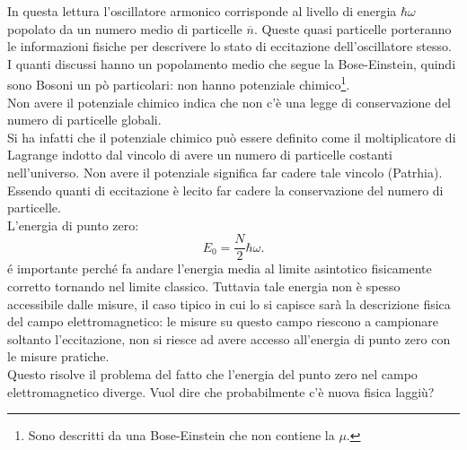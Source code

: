 In questa lettura l'oscillatore armonico corrisponde al livello di energia $\hbar\omega $ popolato da un numero medio di particelle $\overline{n}$. Queste quasi particelle porteranno le informazioni fisiche per descrivere lo stato di eccitazione dell'oscillatore stesso. \\
I quanti discussi hanno un popolamento medio che segue la Bose-Einstein, quindi sono Bosoni un pò particolari: non hanno potenziale chimico\footnote{Sono descritti da una Bose-Einstein che non contiene la $\mu $.}.\\
Non avere il potenziale chimico indica che non c'è una legge di conservazione del numero di particelle globali.\\
Si ha infatti che il potenziale chimico può essere definito come il moltiplicatore di Lagrange indotto dal vincolo di avere un numero di particelle costanti nell'universo. Non avere il potenziale significa far cadere tale vincolo (Patrhia).
Essendo quanti di eccitazione è lecito far cadere la conservazione del numero di particelle.\\
L'energia di punto zero:
\[
	E_0 = \frac{N}{2}\hbar\omega 
.\] 
é importante perché fa andare l'energia media al limite asintotico fisicamente corretto tornando nel limite classico. 
Tuttavia tale energia non è spesso accessibile dalle misure, il caso tipico in cui lo si capisce sarà la descrizione fisica del campo elettromagnetico: le misure su questo campo riescono a campionare soltanto l'eccitazione, non si riesce ad avere accesso all'energia di punto zero con le misure pratiche.\\
Questo risolve il problema del fatto che l'energia del punto zero nel campo elettromagnetico diverge. Vuol dire che probabilmente c'è nuova fisica laggiù?

